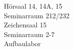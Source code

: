 \documentclass[a4paper]{article}
\begin{document}
\begin{center}

\begin{vsltext}{1.6cm}{2cm}

    \vspace{0.5cm}

    Hörsaal 14, 14A, 15\\
    Seminarraum 212/232\\
    Zeichensaal 15\\
    Seminarraum 2-7\\
    Aufbaulabor\\
\end{vsltext}

\end{center}
\end{document}
